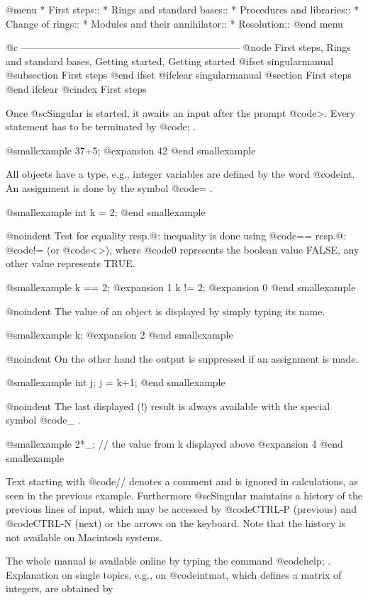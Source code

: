 @menu
* First steps::
* Rings and standard bases::
* Procedures and libraries::
* Change of rings::
* Modules and their annihilator::
* Resolution::
@end menu

@c ------------------------------------------------------------------
@node First steps, Rings and standard bases, Getting started, Getting started
@ifset singularmanual
@subsection First steps
@end ifset
@ifclear singularmanual
@section First steps
@end ifclear
@cindex First steps

Once @sc{Singular} is started, it awaits an input after the prompt
@code{>}.  Every statement has to be terminated by @code{;} .

@smallexample
37+5;
@expansion{} 42
@end smallexample

All objects have a type, e.g., integer variables are defined by
the word @code{int}. An assignment is done by the symbol @code{=} .

@smallexample
int k = 2;
@end smallexample

@noindent Test for equality resp.@: inequality is done using @code{==}
resp.@: @code{!=} (or @code{<>}), where @code{0} represents the boolean
value FALSE, any other value represents TRUE.

@smallexample
k == 2;
@expansion{} 1
k != 2;
@expansion{} 0
@end smallexample

@noindent The value of an object is displayed by simply typing its name.

@smallexample
k;
@expansion{} 2
@end smallexample

@noindent On the other hand the output is suppressed if an assignment
is made.

@smallexample
int j;
j = k+1;
@end smallexample

@noindent The last displayed (!) result is always available
with the special symbol @code{_} .

@smallexample
2*_;   // the value from k displayed above
@expansion{} 4
@end smallexample

Text starting with @code{//} denotes a comment and is ignored in
calculations, as seen in the previous example. Furthermore @sc{Singular}
maintains a history of the previous lines of input, which may be accessed by
@code{CTRL-P} (previous) and @code{CTRL-N} (next) or the arrows on the
keyboard. Note that the history is not available on Macintosh systems.

The whole manual is available online by typing the command @code{help;} .
Explanation on single topics, e.g., on @code{intmat}, which defines a
matrix of integers, are obtained by

